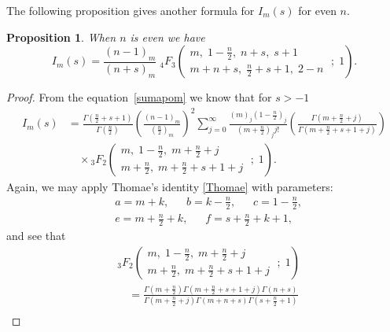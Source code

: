 \documentclass{article}
\theoremstyle{boldremark}
\newtheorem{proposition}{Proposition}[section]
\renewcommand\[{\begin{equation}}
\renewcommand\]{\end{equation}}
\theoremstyle{definition}
\numberwithin{equation}{section}
\begin{document}
The following proposition gives another formula for $I_m(s)$ for even $n$.
\begin{proposition} \label{Prop 3.2}
    When $n$ is even we have
    \begin{equation}\label{sude_dva_dva}
        I_m(s) = \frac{(n-1)_m}{(n+s)_m} \; {}_4F_3 \left( \begin{matrix} m,\; 1 - \frac{n}{2},\; n+s,\; s+1 \\[4pt] m + n + s,\; \frac{n}{2} + s + 1,\; 2-n \end{matrix} \;;\; 1 \right).
    \end{equation}
\end{proposition}
\begin{proof}
From the equation~\eqref{sumapom} we know that for $s > -1$
\begin{align}\label{2.2-1}
    I_m(s) &= 
      \frac{\Gamma\left(\frac{n}{2} + s + 1\right)}{\Gamma\left(\frac{n}{2}\right)} \left( \frac{(n-1)_m}{\left(\frac{n}{2}\right)_m} \right)^2 \sum_{j=0}^{\infty} \frac{(m)_j \left(1 - \frac{n}{2}\right)_j}{\left(m + \frac{n}{2}\right)_j j!} \left( \frac{\Gamma\left(m + \frac{n}{2} + j\right)}{\Gamma\left(m + \frac{n}{2} + s + 1 + j\right)} \right)\nonumber \\
    &\quad \times {}_3F_2 \left( \begin{matrix} m,\; 1 - \frac{n}{2},\; m+\frac{n}{2}+j \\[4pt] m + \frac{n}{2},\; m+\frac{n}{2}+s+1+j \end{matrix} \;;\; 1 \right).
\end{align}
Again, we may apply Thomae's identity \eqref{Thomae}
with parameters:
\begin{align*}
    & a=m+k,\;\; \quad b=k-\tfrac n2,\;\; \quad c=1-\tfrac n2,\\
    & e=m+\tfrac n2+k,\;\; \quad f=s+\tfrac n2+k+1,
\end{align*}
and see that
\begin{align}\label{2.2-2}
    &{}_3F_2 \left( \begin{matrix} m,\; 1-\frac{n}{2},\; m+\frac{n}{2}+j \\[4pt] m+\frac{n}{2},\; m+\frac{n}{2}+s+1+j \end{matrix} \;;\; 1 \right) \nonumber \\
    &\quad = \frac{\Gamma\left(m+\frac{n}{2}\right) \Gamma\left(m+\frac{n}{2}+s+1+j\right) \Gamma(n+s)}{\Gamma\left(m+\frac{n}{2}+j\right) \Gamma(m+n+s) \Gamma\left(s+\frac{n}{2}+1\right)} \nonumber \\

\end{align}
\end{proof}
\end{document}
